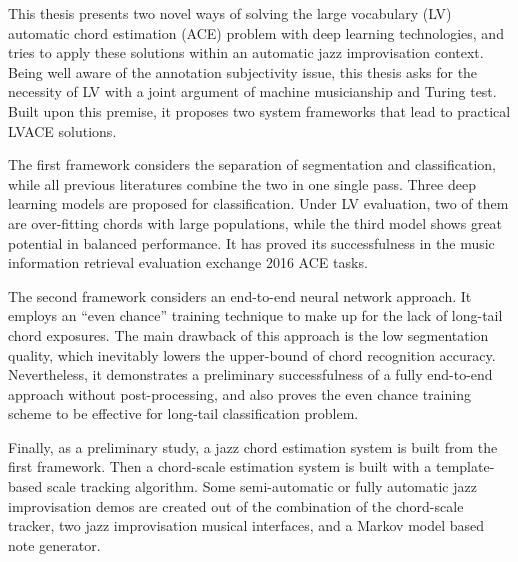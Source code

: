 


\begin{abstracts}        %
This thesis presents two novel ways of solving the large vocabulary (LV) automatic chord estimation (ACE) problem with deep learning technologies, and tries to apply these solutions within an automatic jazz improvisation context. Being well aware of the annotation subjectivity issue, this thesis asks for the necessity of LV with a joint argument of machine musicianship and Turing test. Built upon this premise, it proposes two system frameworks that lead to practical LVACE solutions.

The first framework considers the separation of segmentation and classification, while all previous literatures combine the two in one single pass. Three deep learning models are proposed for classification. Under LV evaluation, two of them are over-fitting chords with large populations, while the third model shows great potential in balanced performance. It has proved its successfulness in the music information retrieval evaluation exchange 2016 ACE tasks.

The second framework considers an end-to-end neural network approach. It employs an ``even chance'' training technique to make up for the lack of long-tail chord exposures. The main drawback of this approach is the low segmentation quality, which inevitably lowers the upper-bound of chord recognition accuracy. Nevertheless, it demonstrates a preliminary successfulness of a fully end-to-end approach without post-processing, and also proves the even chance training scheme to be effective for long-tail classification problem.

Finally, as a preliminary study, a jazz chord estimation system is built from the first framework. Then a chord-scale estimation system is built with a template-based scale tracking algorithm. Some semi-automatic or fully automatic jazz improvisation demos are created out of the combination of the chord-scale tracker, two jazz improvisation musical interfaces, and a Markov model based note generator.
\end{abstracts}


